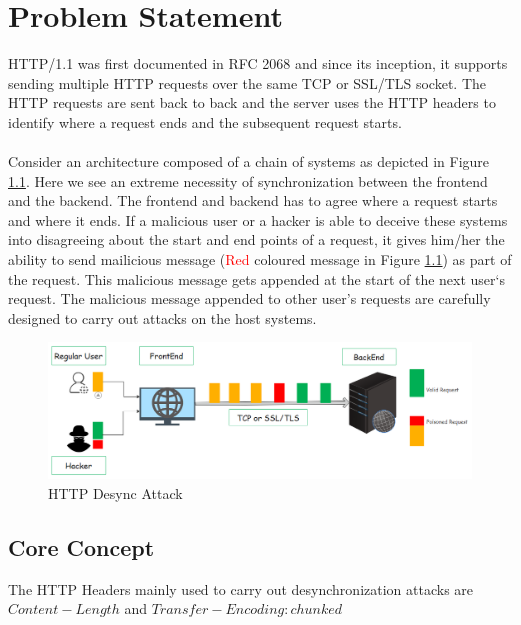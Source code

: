 \chapter{Problem Statement}
HTTP/1.1 was first documented in RFC 2068 \cite{b9} and since its inception, it supports sending multiple HTTP requests over the same TCP or SSL/TLS socket. The HTTP requests are sent back to back and the server uses the HTTP headers to identify where a request ends and the subsequent request starts. \\\\

Consider an architecture composed of a chain of systems as depicted in Figure \ref{fig:HTTP Desync Attack}. Here we see an extreme necessity of synchronization between the frontend and the backend. The frontend and backend has to agree where a request starts and where it ends. If a malicious user or a hacker is able to deceive these systems into disagreeing about the start and end points of a request, it gives him/her the ability to send mailicious message (\textcolor{red}{Red} coloured message in Figure \ref{fig:HTTP Desync Attack}) as part of the request. This malicious message gets appended at the start of the next user`s request. The malicious message appended to other user's requests are carefully designed to carry out attacks on the host systems. 

\begin{figure}
	\includegraphics[width=14cm]{images/HTTP_Desync}
	\caption{HTTP Desync Attack}
	\label{fig:HTTP Desync Attack}
\end{figure}

\section{Core Concept}
The HTTP Headers mainly used to carry out desynchronization attacks are $Content-Length$ and $Transfer-Encoding: chunked$